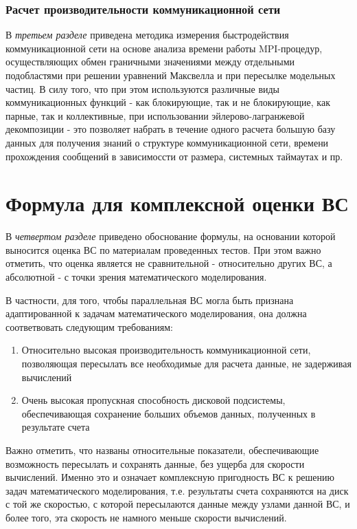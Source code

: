 \subsubsection{Расчет производительности коммуникационной сети}
\label{perfCommNet}
В \textit{третьем разделе} приведена методика измерения быстродействия коммуникационной сети на основе анализа времени работы MPI-процедур, осуществляющих обмен граничными значениями между отдельными подобластями при решении уравнений Максвелла и при пересылке модельных частиц. В силу того, что при этом используются различные виды коммуникационных функций  - как блокирующие, так и не блокирующие, как парные, так и коллективные, при использовании эйлерово-лагранжевой декомпозиции - это позволяет набрать в течение одного расчета большую базу данных для получения знаний о структуре коммуникационной сети, времени прохождения сообщений в зависимоссти от размера, системных таймаутах и пр. 

%		
%		

\section{Формула для комплексной оценки ВС}
\label{complex_evaluation}
В \textit{четвертом разделе} приведено обоснование формулы, на основании которой выносится оценка ВС по материалам проведенных тестов. При этом важно отметить, что оценка является не сравнительной - относительно других ВС, а абсолютной - с точки зрения математического моделирования. 

В частности, для того, чтобы параллельная ВС могла быть признана адаптированной к задачам математического моделирования, она должна соответвовать следующим требованиям:
\begin{enumerate}
	\item Относительно высокая производительность коммуникационной сети, позволяющая пересылать все необходимые для расчета данные, не задерживая вычислений
	\item Очень высокая пропускная способность дисковой подсистемы, обеспечивающая сохранение больших объемов данных, полученных в результате счета  	
\end{enumerate}

Важно отметить, что названы относительные показатели, обеспечивающие возможность пересылать и сохранять данные, без ущерба для скорости вычислений. Именно это и означает  комплексную пригодность ВС к решению задач математического моделирования, т.е. результаты счета сохраняются на диск с той же скоростью, с которой пересылаются данные между узлами данной ВС, и более того, эта скорость не намного меньше скорости вычислений.

